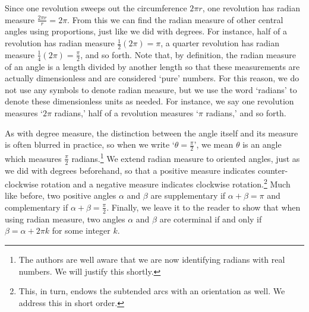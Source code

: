 \documentclass{ximera}
\begin{document}
Since one revolution sweeps out the circumference $2\pi r$, one revolution has radian measure $\frac{2 \pi r}{r} = 2 \pi$.  From this we can find the radian measure of other central angles using proportions, just like we did with degrees.    For instance, half of a revolution has radian measure  $\frac{1}{2} (2 \pi) = \pi$, a quarter revolution has radian measure $\frac{1}{4} (2 \pi) = \frac{\pi}{2}$, and so forth.   Note that, by definition, the radian measure of an angle is a length divided by another length so that these measurements are actually dimensionless and are considered `pure' numbers. For this reason, we do not use any symbols to denote radian measure, but we use the word `radians' to denote these dimensionless units as needed. For instance, we say one revolution measures `$2\pi$ radians,' half of a revolution measures `$\pi$ radians,' and so forth.  

\smallskip

As with degree measure, the distinction between the angle itself and its measure is often blurred in practice, so when we write  `$\theta = \frac{\pi}{2}$', we mean $\theta$ is an angle which measures $\frac{\pi}{2}$ radians.\footnote{The authors are well aware that we are now identifying radians with real numbers.  We will justify this shortly.} We extend radian measure to oriented angles, just as we did with degrees beforehand, so that a positive measure indicates counter-clockwise rotation and a negative measure indicates clockwise rotation.\footnote{This, in turn, endows the subtended arcs with an orientation as well.  We address this in short order.}  Much like before, two positive angles $\alpha$ and $\beta$ are supplementary if $\alpha + \beta = \pi$ and complementary if $\alpha + \beta = \frac{\pi}{2}$.   Finally, we leave it to the reader to show that when using radian measure, two angles $\alpha$ and $\beta$ are coterminal if and only if $\beta = \alpha + 2\pi k$ for some integer $k$. 
\end{document}
